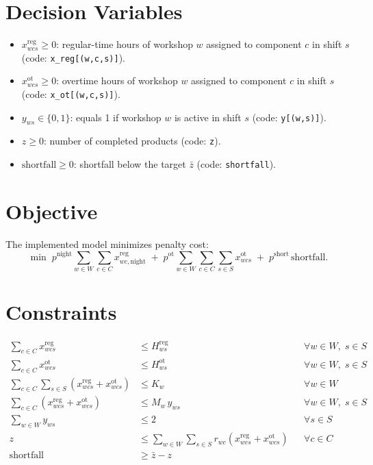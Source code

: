 \section*{Decision Variables}

\begin{itemize}
    \item $x^{\mathrm{reg}}_{wcs} \ge 0$: regular-time hours of workshop $w$ assigned to component $c$ in shift $s$ (code: \texttt{x\_reg[(w,c,s)]}).
    \item $x^{\mathrm{ot}}_{wcs} \ge 0$: overtime hours of workshop $w$ assigned to component $c$ in shift $s$ (code: \texttt{x\_ot[(w,c,s)]}).
    \item $y_{ws} \in \{0,1\}$: equals 1 if workshop $w$ is active in shift $s$ (code: \texttt{y[(w,s)]}).
    \item $z \ge 0$: number of completed products (code: \texttt{z}).
    \item $\mathrm{shortfall} \ge 0$: shortfall below the target $\bar z$ (code: \texttt{shortfall}).
\end{itemize}

\section*{Objective}

The implemented model minimizes penalty cost:
\[
\min \;
p^{\mathrm{night}} \sum_{w\in W}\sum_{c\in C} x^{\mathrm{reg}}_{wc,\mathrm{night}}
\;+\;
p^{\mathrm{ot}} \sum_{w\in W}\sum_{c\in C}\sum_{s\in S} x^{\mathrm{ot}}_{wcs}
\;+\;
p^{\mathrm{short}} \,\mathrm{shortfall}.
\]

\section*{Constraints}

\begin{align}
\sum_{c\in C} x^{\mathrm{reg}}_{wcs} &\le H^{\mathrm{reg}}_{ws}
&& \forall w\in W,\; s\in S
\label{con:reg_limit}
\\
\sum_{c\in C} x^{\mathrm{ot}}_{wcs} &\le H^{\mathrm{ot}}_{ws}
&& \forall w\in W,\; s\in S
\label{con:ot_limit}
\\
\sum_{c\in C}\sum_{s\in S}\left(x^{\mathrm{reg}}_{wcs}+x^{\mathrm{ot}}_{wcs}\right) &\le K_w
&& \forall w\in W
\label{con:total_cap}
\\
\sum_{c\in C}\left(x^{\mathrm{reg}}_{wcs}+x^{\mathrm{ot}}_{wcs}\right) &\le M_w\, y_{ws}
&& \forall w\in W,\; s\in S
\label{con:bigm}
\\
\sum_{w\in W} y_{ws} &\le 2
&& \forall s\in S
\label{con:max_two}
\\
z &\le \sum_{w\in W}\sum_{s\in S} r_{wc}\left(x^{\mathrm{reg}}_{wcs}+x^{\mathrm{ot}}_{wcs}\right)
&& \forall c\in C
\label{con:z_component}
\\
\mathrm{shortfall} &\ge \bar z - z
\label{con:shortfall}
\end{align}

